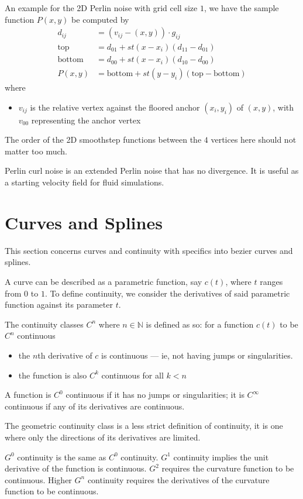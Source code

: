 \documentclass[11pt]{article}
\begin{document}
An example for the 2D Perlin noise with grid cell size $1$, we have the sample function $P(x, y)$ be computed by
\begin{align*}
	d_{ij} &= (v_{ij} - (x, y)) \cdot g_{ij}\\
	\text{top} &= d_{01} + st(x-x_i) (d_{11} - d_{01})\\
	\text{bottom} &= d_{00} + st(x-x_i) (d_{10} - d_{00})\\
	P(x, y) &= \text{bottom} + st(y-y_i) (\text{top} - \text{bottom})
\end{align*}
where
\begin{itemize}
	\item $v_{ij}$ is the relative vertex against the floored anchor $(x_i, y_i)$ of $(x, y)$, with $v_{00}$ representing the anchor vertex
\end{itemize}
The order of the 2D smoothstep functions between the $4$ vertices here should not matter too much.

Perlin curl noise is an extended Perlin noise that has no divergence. It is useful as a starting velocity field for fluid simulations.

\newpage
\section{Curves and Splines}
This section concerns curves and continuity with specifics into bezier curves and splines.

A curve can be described as a parametric function, say $c(t)$, where $t$ ranges from $0$ to $1$. To define continuity, we consider the derivatives of said parametric function against its parameter $t$.

The continuity classes $C^n$ where $n \in \mathbb{N}$ is defined as so: for a function $c(t)$ to be $C^n$ continuous
\begin{itemize}
	\item the $n$th derivative of $c$ is continuous --- ie, not having jumps or singularities.
	\item the function is also $C^k$ continuous for all $k < n$
\end{itemize}
A function is $C^0$ continuous if it has no jumps or singularities; it is $C^\infty$ continuous if any of its derivatives are continuous.

The geometric continuity class is a less strict definition of continuity, it is one where only the directions of its derivatives are limited.

$G^0$ continuity is the same as $C^0$ continuity. $G^1$ continuity implies the unit derivative of the function is continuous. $G^2$ requires the curvature function to be continuous. Higher $G^n$ continuity requires the derivatives of the curvature function to be continuous.
\end{document}
